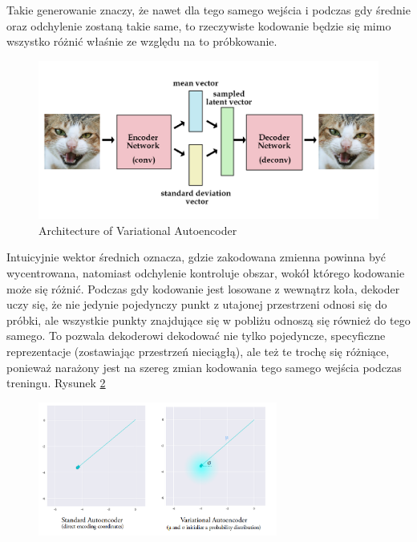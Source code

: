 Takie generowanie znaczy, że nawet dla tego samego wejścia i podczas gdy średnie oraz odchylenie zostaną takie same, to rzeczywiste kodowanie będzie się mimo wszystko różnić właśnie ze względu na to próbkowanie. 

\begin{figure}[h!]
    \centering
    \includegraphics[width=1.0\textwidth]{images/vae_model}
    \caption{Architecture of Variational Autoencoder}
    \label{fig:vae_model}
\end{figure}

Intuicyjnie wektor średnich oznacza, gdzie zakodowana zmienna powinna być wycentrowana, natomiast odchylenie kontroluje obszar, wokół którego kodowanie może się różnić. Podczas gdy kodowanie jest losowane z wewnątrz koła, dekoder uczy się, że nie jedynie pojedynczy punkt z utajonej przestrzeni odnosi się do próbki, ale wszystkie punkty znajdujące się w pobliżu odnoszą się również do tego samego. To pozwala dekoderowi dekodować nie tylko pojedyncze, specyficzne reprezentacje (zostawiając przestrzeń nieciągłą), ale też te trochę się różniące, ponieważ narażony jest na szereg zmian kodowania tego samego wejścia podczas treningu. Rysunek \ref{fig:vae_vs_stand}

\begin{figure}[h!]
    \centering
    \includegraphics[width=0.7\textwidth]{images/vae_vs_stand}
    \caption{}
    \label{fig:vae_vs_stand}
\end{figure}

